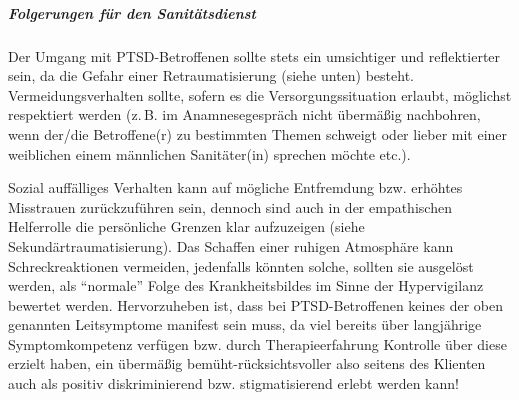 {\subparagraph{Folgerungen für den Sanitätsdienst} Der Umgang mit
PTSD-Betroffenen sollte stets ein umsichtiger und
reflektierter sein, da die Gefahr einer Retraumatisierung
(siehe unten) besteht. Vermeidungsverhalten sollte, sofern
es die Versorgungssituation erlaubt, möglichst respektiert
werden (z.\,B. im Anamnesegespräch nicht übermäßig
nachbohren, wenn der/die Betroffene(r) zu bestimmten Themen
schweigt oder lieber mit einer weiblichen einem männlichen
Sanitäter(in) sprechen möchte etc.). 

Sozial auffälliges
Verhalten kann auf mögliche Entfremdung bzw. erhöhtes
Misstrauen zurückzuführen sein, dennoch sind auch in der
empathischen Helferrolle die persönliche Grenzen klar
aufzuzeigen (siehe Sekundärtraumatisierung). Das Schaffen
einer ruhigen Atmosphäre kann Schreckreaktionen vermeiden,
jedenfalls könnten solche, sollten sie ausgelöst werden, als
\enquote{normale} Folge des Krankheitsbildes im Sinne der
Hypervigilanz bewertet werden. Hervorzuheben ist, dass bei
PTSD-Betroffenen keines der oben genannten Leitsymptome
manifest sein muss, da viel bereits über langjährige
Symptomkompetenz verfügen bzw. durch Therapieerfahrung
Kontrolle über diese erzielt haben, ein übermäßig
bemüht-rücksichtsvoller also seitens des Klienten auch als
positiv diskriminierend bzw. stigmatisierend erlebt werden
kann!}
{}
{}
{}
{}

